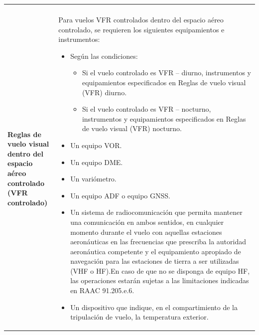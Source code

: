 \begin{longtable}{m{0.25\textwidth}m{0.75\textwidth}}
{\begin{itemize}
  \end{itemize}
}
\\  
\parbox{\linewidth}{\bf Reglas de vuelo visual \\dentro del espacio aéreo\\ controlado\\ (VFR controlado)}
& {\scriptsize 
 Para vuelos VFR controlados dentro del espacio aéreo controlado, se requieren los siguientes equipamientos e instrumentos:
 \begin{itemize}
 \item Seg\'un las condiciones:
   \begin{itemize}
   \item Si el vuelo controlado es VFR – diurno, instrumentos y
     equipamientos especificados en Reglas de vuelo visual (VFR)
     diurno.
   \item Si el vuelo controlado es VFR – nocturno, instrumentos y
     equipamientos especificados en Reglas de vuelo visual (VFR)
     nocturno.
   \end{itemize}
 \item Un equipo VOR.
 \item Un equipo DME.
 \item Un variómetro.
 \item Un equipo ADF o equipo GNSS.
 \item Un  sistema  de  radiocomunicación  que  permita  mantener  una  comunicación  en  ambos  sentidos,  en  cualquier momento durante el vuelo con aquellas estaciones aeronáuticas en las frecuencias que prescriba la autoridad aeronáutica  competente  y  el  equipamiento  apropiado  de  navegación  para  las  estaciones  de  tierra  a  ser  utilizadas  (VHF  o HF).En  caso  de  que  no  se  disponga  de  equipo  HF,  las  operaciones  estarán  sujetas a las  limitaciones indicadas en RAAC 91.205.e.6.
 \item Un dispositivo que indique, en el compartimiento de la tripulación de vuelo, la temperatura exterior.
 \end{itemize}


}
\\

  \end{longtable}


